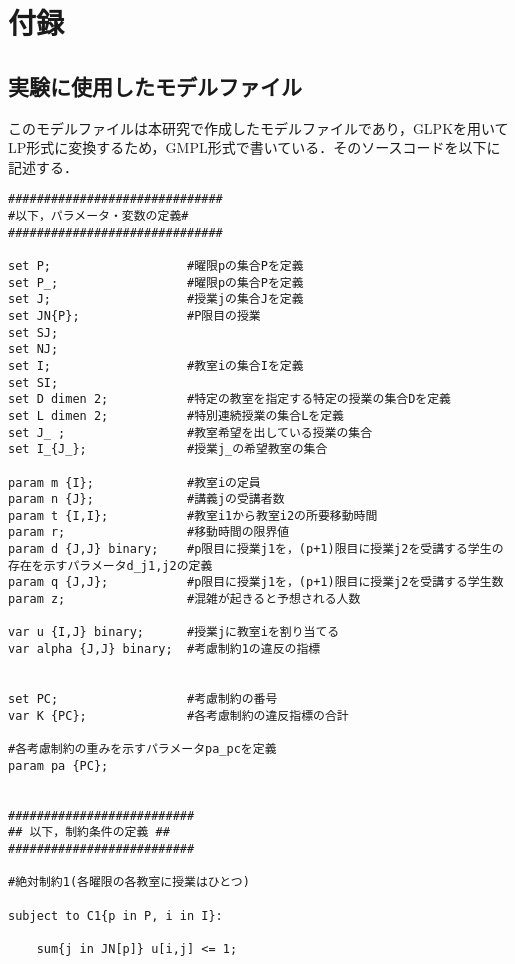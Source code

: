 \chapter{付録}
\label{huroku}

\section{実験に使用したモデルファイル}
このモデルファイルは本研究で作成したモデルファイルであり，GLPKを用いてLP形式に変換するため，GMPL形式で書いている．そのソースコードを以下に記述する．　　

\begin{lstlisting}[label=src1]
##############################
#以下，パラメータ・変数の定義#
##############################

set P;                   #曜限pの集合Pを定義
set P_;                  #曜限pの集合Pを定義
set J;                   #授業jの集合Jを定義
set JN{P};               #P限目の授業
set SJ;                 
set NJ;                 
set I;                   #教室iの集合Iを定義
set SI;                 
set D dimen 2;           #特定の教室を指定する特定の授業の集合Dを定義
set L dimen 2;           #特別連続授業の集合Lを定義
set J_ ;                 #教室希望を出している授業の集合
set I_{J_};              #授業j_の希望教室の集合
                        
param m {I};             #教室iの定員
param n {J};             #講義jの受講者数
param t {I,I};           #教室i1から教室i2の所要移動時間
param r;                 #移動時間の限界値
param d {J,J} binary;    #p限目に授業j1を，(p+1)限目に授業j2を受講する学生の存在を示すパラメータd_j1,j2の定義
param q {J,J};           #p限目に授業j1を，(p+1)限目に授業j2を受講する学生数
param z;                 #混雑が起きると予想される人数

var u {I,J} binary;      #授業jに教室iを割り当てる
var alpha {J,J} binary;  #考慮制約1の違反の指標


set PC;                  #考慮制約の番号　　
var K {PC};              #各考慮制約の違反指標の合計　

#各考慮制約の重みを示すパラメータpa_pcを定義
param pa {PC};


##########################
## 以下，制約条件の定義 ##
##########################

#絶対制約1(各曜限の各教室に授業はひとつ)

subject to C1{p in P, i in I}:

	sum{j in JN[p]} u[i,j] <= 1;


\end{lstlisting}

